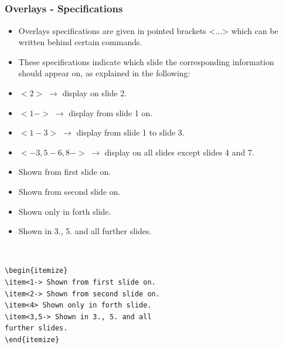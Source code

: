 \documentclass[[newPxFont]{beamer}
\begin{document}
\subsection{}
\begin{frame}[fragile]
  \frametitle{Overlays - Specifications}
 \begin{itemize}
   \item Overlays specifications are given in pointed brackets <...>  which can be written behind certain commands.
\item These specifications indicate which slide the corresponding information should appear on, as explained in the following:
\item $ <2> \;\rightarrow$ display on slide 2.
\item $< 1-> \; \rightarrow$ display from slide 1 on.
\item $<1-3>\; \rightarrow$ display from slide 1 to slide 3.
\item $<-3, 5-6, 8->\; \rightarrow$ display on all slides except slides 4 and 7.
 \end{itemize}
\begin{block}{}
\begin{minipage}{.45\textwidth}
\begin{small}
\begin{itemize}
\item<1-> Shown from first slide on.
\item<2-> Shown from second slide on.
\item<4> Shown only in forth slide.
\item<3,5-> Shown in 3., 5. and all
further slides.
\end{itemize}
\end{small}
\end{minipage}%
\hfill
\begin{minipage}{.55\textwidth}
~
\begin{footnotesize}
\begin{verbatim}
\begin{itemize}
\item<1-> Shown from first slide on.
\item<2-> Shown from second slide on.
\item<4> Shown only in forth slide.
\item<3,5-> Shown in 3., 5. and all
further slides.
\end{itemize}
\end{verbatim}
\end{footnotesize}
\end{minipage}

\end{block}
\end{frame}
\end{document}
